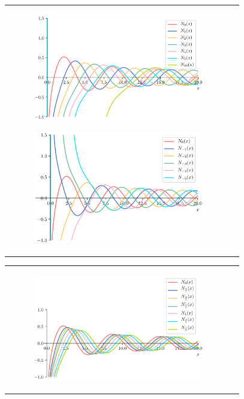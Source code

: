 \documentclass[../main/main]{subfiles}
\begin{document}
\begin{figure}[tb]
\begin{tabular}{cc}
\hspace{-24pt}
 \begin{minipage}{0.50\hsize}\small
    \begin{figure}[H]
      \centering
      \includegraphics[width=75mm]{../fig/bessel/neumann_n.png}
    \end{figure}
 \end{minipage}

 \begin{minipage}{0.50\hsize}
    \begin{figure}[H]
      \centering
      \includegraphics[width=75mm]{../fig/bessel/neumann_n_minus.png}
    \end{figure}
 \end{minipage}
\end{tabular}

\begin{tabular}{cc}
\hspace{-22pt}
 \begin{minipage}{0.50\hsize}
    \begin{figure}[H]
      \centering
      \includegraphics[width=75mm]{../fig/bessel/neumann_nu.png}
    \end{figure}
 \end{minipage}


\end{tabular}
\end{figure}
\end{document}
